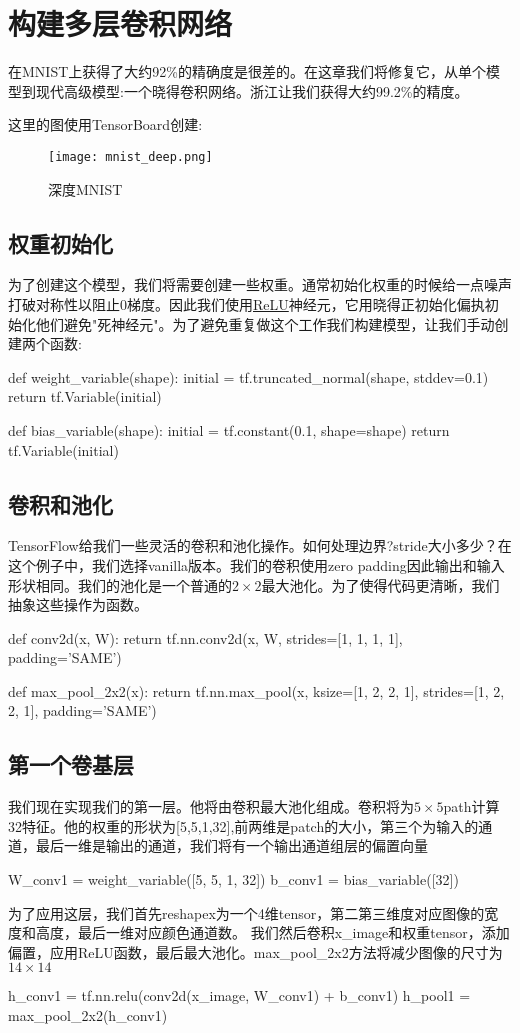 \section{构建多层卷积网络}

在MNIST上获得了大约92\%的精确度是很差的。在这章我们将修复它，从单个模型到现代高级模型:一个晓得卷积网络。浙江让我们获得大约99.2\%的精度。

这里的图使用TensorBoard创建:
\begin{figure}[H]
\centering
\texttt{[image: mnist\_deep.png]}
\caption{深度MNIST}
\end{figure}
\subsection{权重初始化}
为了创建这个模型，我们将需要创建一些权重。通常初始化权重的时候给一点噪声打破对称性以阻止0梯度。因此我们使用\href{https://en.wikipedia.org/wiki/Rectifier_(neural_networks)}{ReLU}神经元，它用晓得正初始化偏执初始化他们避免"死神经元"。为了避免重复做这个工作我们构建模型，让我们手动创建两个函数:
\begin{pythoncode}
def weight_variable(shape):
  initial = tf.truncated_normal(shape, stddev=0.1)
  return tf.Variable(initial)

def bias_variable(shape):
  initial = tf.constant(0.1, shape=shape)
  return tf.Variable(initial)
\end{pythoncode}
\subsection{卷积和池化}
TensorFlow给我们一些灵活的卷积和池化操作。如何处理边界?stride大小多少？在这个例子中，我们选择vanilla版本。我们的卷积使用zero padding因此输出和输入形状相同。我们的池化是一个普通的$2\times2$最大池化。为了使得代码更清晰，我们抽象这些操作为函数。
\begin{pythoncode}
def conv2d(x, W):
  return tf.nn.conv2d(x, W, strides=[1, 1, 1, 1], padding='SAME')

def max_pool_2x2(x):
  return tf.nn.max_pool(x, ksize=[1, 2, 2, 1],
                        strides=[1, 2, 2, 1], padding='SAME')
\end{pythoncode}
\subsection{第一个卷基层}
我们现在实现我们的第一层。他将由卷积最大池化组成。卷积将为$5\times5$path计算32特征。他的权重的形状为[5,5,1,32],前两维是patch的大小，第三个为输入的通道，最后一维是输出的通道，我们将有一个输出通道组层的偏置向量
\begin{pythoncode}
W_conv1 = weight_variable([5, 5, 1, 32])
b_conv1 = bias_variable([32])
\end{pythoncode}
为了应用这层，我们首先reshapex为一个4维tensor，第二第三维度对应图像的宽度和高度，最后一维对应颜色通道数。\newline
{}
我们然后卷积x\_image和权重tensor，添加偏置，应用ReLU函数，最后最大池化。max\_pool\_2x2方法将减少图像的尺寸为$14\times14$
\begin{pythoncode}
h_conv1 = tf.nn.relu(conv2d(x_image, W_conv1) + b_conv1)
h_pool1 = max_pool_2x2(h_conv1)
\end{pythoncode}

